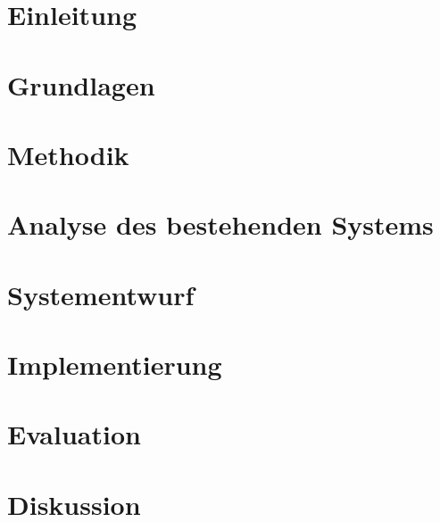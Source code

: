 \documentclass[12pt,oneside]{article}
\begin{document}
\listoffigures

\listoftables
\clearpage


\cleardoublepage
{}
    \setcounter{page}{1}
\lhead{\nouppercase{\leftmark}}


\section{Einleitung}\label{sec:einleitung}


\section{Grundlagen}\label{sec:grundlagen}


\section{Methodik}\label{sec:methodik}


\section{Analyse des bestehenden Systems}\label{sec:vorarbeit}


\section{Systementwurf}\label{sec:entwurf}


\section{Implementierung}\label{sec:implementierung}


\section{Evaluation}\label{sec:evaluation}


\section{Diskussion}\label{sec:diskussion}

\end{document}
